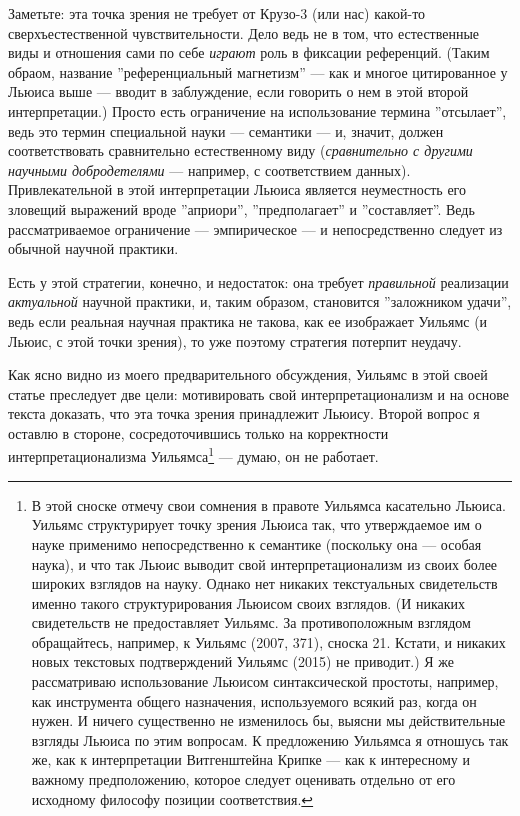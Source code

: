 \documentclass[11pt]{book}
\begin{document}
Заметьте: эта точка зрения не требует от Крузо-3 (или нас) какой-то сверхъестественной чувствительности. Дело ведь не в том, что естественные виды и отношения сами по себе \textit{играют} роль в фиксации референций. (Таким обраом, название ''референциальный магнетизм'' --- как и многое цитированное у Льюиса выше --- вводит в заблуждение, если говорить о нем в этой второй интерпретации.) Просто есть ограничение на использование термина ''отсылает'', ведь это термин специальной науки --- семантики --- и, значит, должен соответствовать сравнительно естественному виду (\textit{сравнительно с другими научными добродетелями} --- например, с соответствием данных). Привлекательной в этой интерпретации Льюиса является неуместность его зловещий выражений вроде ''априори'', ''предполагает'' и ''составляет''. Ведь рассматриваемое ограничение --- эмпирическое --- и непосредственно следует из обычной научной практики.

Есть у этой стратегии, конечно, и недостаток: она требует \textit{правильной} реализации \textit{актуальной} научной практики, и, таким образом, становится ''заложником удачи'', ведь если реальная научная практика не такова, как ее изображает Уильямс (и Льюис, с этой точки зрения), то уже поэтому стратегия потерпит неудачу.

Как ясно видно из моего предварительного обсуждения, Уильямс в этой своей статье преследует две цели: мотивировать свой интерпретационализм и на основе текста доказать, что эта точка зрения принадлежит Льюису. Второй вопрос я оставлю в стороне, сосредоточившись только на корректности интерпретационализма Уильямса\footnote{В этой сноске отмечу свои сомнения в правоте Уильямса касательно Льюиса. Уильямс структурирует точку зрения Льюиса так, что утверждаемое им о науке применимо непосредственно к семантике (поскольку она --- особая наука), и что так Льюис выводит свой интерпретационализм из своих более широких взглядов на науку. Однако  нет никаких текстуальных свидетельств именно такого структурирования Льюисом своих взглядов. (И никаких свидетельств не предоставляет Уильямс. За противоположным взглядом обращайтесь, например, к Уильямс (2007, 371), сноска 21. Кстати, и никаких новых текстовых подтверждений Уильямс (2015) не приводит.) Я же рассматриваю использование Льюисом синтаксической простоты, например, как инструмента общего назначения, используемого всякий раз, когда он нужен. И ничего существенно не изменилось бы, выясни мы действительные взгляды Льюиса по этим вопросам. К предложению Уильямса я отношусь так же, как к интерпретации Витгенштейна Крипке --- как к интересному и важному предположению, которое следует оценивать отдельно от его исходному философу позиции соответствия.} --- думаю, он не работает.
\end{document}
